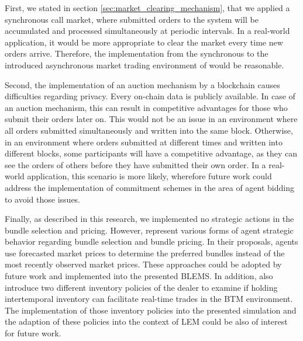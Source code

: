 First, we stated in section \ref{sec:market_clearing_mechanism}, that we
applied a synchronous call market, where submitted orders to the system
will be accumulated and processed simultaneously at periodic intervals.
In a real-world application, it would be more appropriate to clear the market every time new orders arrive. Therefore,
the implementation from the synchronous to the introduced asynchronous market trading environment of  would be reasonable. 

Second, the implementation of an auction mechanism by a blockchain causes 
difficulties regarding privacy. Every on-chain data is publicly available. 
In case of an auction mechanism, this can result in competitive advantages
for those who submit their orders later on. 
This would not be an issue in an environment where all orders submitted simultaneously and written into the same block.
Otherwise, in an environment where orders submitted at different times and written into different blocks,
some participants will have a competitive advantage, as they can see the orders 
of others before they have submitted their own order.
In a real-world application, this scenario is more likely, wherefore
future work could address the implementation of commitment schemes
in the area of agent bidding to avoid those issues.

Finally, as described in this research, we implemented no strategic
actions in the bundle selection and pricing. 
However,  represent various 
forms of agent strategic behavior regarding bundle selection 
and bundle pricing.
In their proposals, agents use forecasted market prices to determine the preferred bundles
instead of the most recently observed market prices. 
These approaches could be adopted by future work and implemented
into the presented BLEMS.
In addition,  also introduce two
different inventory policies of the dealer to examine if holding intertemporal inventory can 
facilitate real-time trades in the BTM environment. The implementation of those inventory policies
into the presented simulation and the adaption of these policies
into the context of LEM could be also of interest for future work. 








\begin{comment}

\end{comment}
